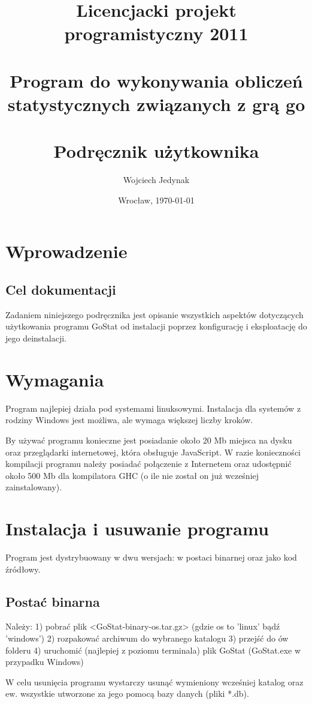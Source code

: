 \documentclass[10pt,leqno]{article}
\title{\LARGE Licencjacki projekt programistyczny 2011 \\ 
       \ \\
       Program do wykonywania obliczeń statystycznych związanych z grą go \\ 
       \ \\
       Podręcznik użytkownika }
\author{Wojciech Jedynak}
\date{Wrocław, \today}
\begin{document}
\maketitle 

\thispagestyle{empty}
\tableofcontents

\newpage

\section{Wprowadzenie}

\subsection{Cel dokumentacji}
Zadaniem niniejszego podręcznika jest opisanie wszystkich aspektów dotyczących użytkowania programu GoStat od instalacji poprzez konfigurację
i eksploatację do jego deinstalacji.

\section{Wymagania}
Program najlepiej działa pod systemami linuksowymi. Instalacja dla systemów z rodziny Windows jest możliwa, ale wymaga większej liczby kroków. 

By używać programu konieczne jest posiadanie około 20 Mb miejsca na dysku oraz przeglądarki internetowej, która obsługuje JavaScript. 
W razie konieczności kompilacji programu należy posiadać połączenie z Internetem oraz udostępnić około 500 Mb dla kompilatora GHC (o ile nie 
został on już wcześniej zainstalowany).

\newpage

\section{Instalacja i usuwanie programu}
Program jest dystrybuowany w dwu wersjach: w postaci binarnej oraz jako kod źródłowy.

\subsection{Postać binarna}
Należy: 
1) pobrać plik <GoStat-binary-os.tar.gz> (gdzie os to 'linux' bądź 'windows')
2) rozpakować archiwum do wybranego katalogu
3) przejść do ów folderu
4) uruchomić (najlepiej z poziomu terminala) plik GoStat (GoStat.exe w przypadku Windows)

W celu usunięcia programu wystarczy usunąć wymieniony wcześniej katalog oraz ew. wszystkie utworzone za jego pomocą bazy danych (pliki *.db).
\end{document}

